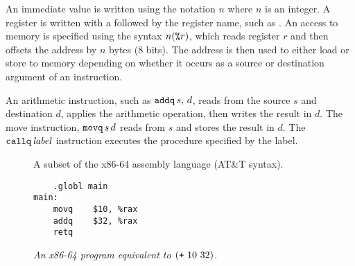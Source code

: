 \documentclass[11pt]{book}
\begin{document}
An immediate value is written using the notation \key{\$}$n$ where $n$
is an integer. 
%
A register is written with a \key{\%} followed by the register name,
such as .
%
An access to memory is specified using the syntax $n(\texttt{\%}r)$,
which reads register $r$ and then offsets the address by $n$ bytes
(8 bits). The address is then used to either load or store to memory
depending on whether it occurs as a source or destination argument of
an instruction.

An arithmetic instruction, such as $\texttt{addq}\,s,\,d$, reads from the
source $s$ and destination $d$, applies the arithmetic operation, then
writes the result in $d$.
%
The move instruction, $\texttt{movq}\,s\,d$ reads from $s$ and stores the
result in $d$. 
%
The $\texttt{callq}\,\mathit{label}$ instruction executes the procedure
specified by the label.

\begin{figure}[tbp]
\caption{A subset of the x86-64 assembly language (AT\&T syntax).}
\label{fig:x86-a}
\end{figure}


\begin{wrapfigure}{r}{2.25in}
\begin{lstlisting}
	.globl main
main:
	movq	$10, %rax
	addq	$32, %rax
	retq
\end{lstlisting}
\caption{\it An x86-64 program equivalent to $(\texttt{+}~10~32)$.}
\label{fig:p0-x86}
\end{wrapfigure}
\end{document}

